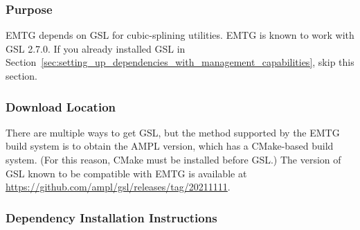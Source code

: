 
\subsubsection{Purpose}

\ac{EMTG} depends on \ac{GSL} for cubic-splining utilities. \ac{EMTG} is known to work with \ac{GSL} 2.7.0.  If you already installed \ac{GSL} in Section~\ref{sec:setting_up_dependencies_with_management_capabilities}, skip this section. 

\subsubsection{Download Location}

There are multiple ways to get \ac{GSL}, but the method supported by the \ac{EMTG} build system is to obtain the AMPL version, which has a CMake-based build system. (For this reason, CMake must be installed before \ac{GSL}.) The version of \ac{GSL} known to be compatible with \ac{EMTG} is available at \url{https://github.com/ampl/gsl/releases/tag/20211111}. 

\subsubsection{Dependency Installation Instructions}

